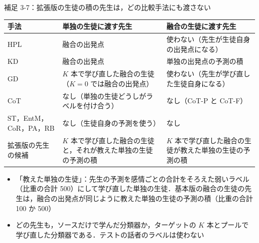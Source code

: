 \begin{frame}{補足 3-7：拡張版の生徒の積の先生は，どの比較手法にも渡さない}
  \label{s:c:teach}
  \vspace{-0.4em}
  \centering\scriptsize
  \renewcommand{\arraystretch}{1.08}
  \begin{tabularx}{\textwidth}{@{}p{2.9cm} >{\raggedright\arraybackslash}X >{\raggedright\arraybackslash}X@{}}
    \toprule
    手法 & 単独の生徒に渡す先生 & 融合の生徒に渡す先生 \\
    \midrule
    HPL & 融合の出発点 & 使わない（先生が生徒自身の出発点になる） \\
    KD & 融合の出発点 & 単独の出発点の予測の積 \\
    GD & $K$ 本で学び直した融合の生徒（$K=0$ では融合の出発点） & 使わない（先生が学び直した生徒自身になる） \\
    CoT & なし（単独の生徒どうしがラベルを付け合う） & なし（CoT-P と CoT-F） \\
    ST，EntM，CoR，PA，RB & なし（生徒自身の予測を使う） & なし \\
    \midrule
    \textcolor{cExt}{拡張版}の先生の候補 & $K$ 本で学び直した融合の生徒と，それが教えた単独の生徒の予測の積 & $K$ 本で学び直した融合の生徒が教えた単独の生徒の予測の積 \\
    \bottomrule
  \end{tabularx}\par
  \vspace{0.2em}\raggedright
  \begin{itemize}\scriptsize\setlength{\itemsep}{1pt}
    \item 「教えた単独の生徒」：先生の予測を感情ごとの合計をそろえた弱いラベル（比重の合計 500）にして学び直した単独の生徒．基本版の融合の生徒の先生は，融合の出発点が同じように教えた単独の生徒の予測の積（比重の合計 100 か 500）
    \item どの先生も，ソースだけで学んだ分類器か，ターゲットの $K$ 本とプールで学び直した分類器である．テストの話者のラベルは使わない
  \end{itemize}
\end{frame}

